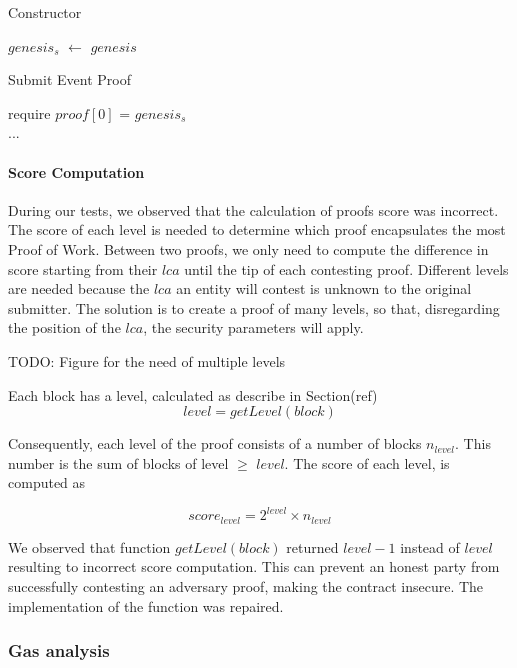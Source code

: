 \begin{algorithm}
    \caption{Constructor}
    \label{algo:avoid_premining_ctor}
    $genesis_{s}$ $\leftarrow$ $genesis$
\end{algorithm}
\vspace{-0.7cm}
\begin{algorithm}
    \caption{Submit Event Proof}
    \label{algo:avoid_premining_submit}
    require $proof[0]$ = $genesis_{s}$ \\
    ...
\end{algorithm}

\paragraph{Score Computation}

During our tests, we observed that the calculation of proofs score was
incorrect. The score of each level is needed to determine which proof
encapsulates the most Proof of Work. Between two proofs, we only need to
compute the difference in score starting from their $lca$ until the tip of each
contesting proof. Different levels are needed because the $lca$ an entity will
contest is unknown to the original submitter. The solution is to create a proof
of many levels, so that, disregarding the position of the $lca$, the security
parameters will apply.

TODO: Figure for the need of multiple levels

Each block has a level, calculated as describe in Section(ref)
\[ level = getLevel(block) \]

Consequently, each level of the proof consists of a number of blocks
$n_{level}$. This number is the sum of blocks of level $\geq$ $level$.  The
score of each level, is computed as

\[ score_{level} = 2^{level} \times n_{level}\]

We observed that function $getLevel(block)$  returned $level-1$ instead of
$level$ resulting to incorrect score computation. This can prevent an honest
party from successfully contesting an adversary proof, making the contract
insecure. The implementation of the function was repaired.

\subsubsection{Gas analysis}

